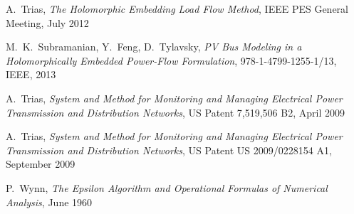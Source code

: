 \documentclass[12pt,a4paper]{article}
\begin{document}
	\begin{thebibliography}{1}
		A.~Trias, \emph{The Holomorphic Embedding Load Flow Method}, IEEE PES General Meeting, July 2012
		
		M.~K.~Subramanian, Y.~Feng, D.~Tylavsky, \emph{PV Bus Modeling in a Holomorphically Embedded Power-Flow Formulation}, 978-1-4799-1255-1/13, IEEE, 2013
		
		A.~Trias, \emph{System and Method for Monitoring and Managing Electrical Power Transmission and Distribution Networks}, US Patent 7,519,506 B2, April 2009
		
		A.~Trias, \emph{System and Method for Monitoring and Managing Electrical Power Transmission and Distribution Networks}, US Patent US 2009/0228154 A1, September 2009
					
		P.~Wynn, \emph{The Epsilon Algorithm and Operational Formulas of Numerical Analysis}, June 1960
		
	\end{thebibliography}
\end{document}
